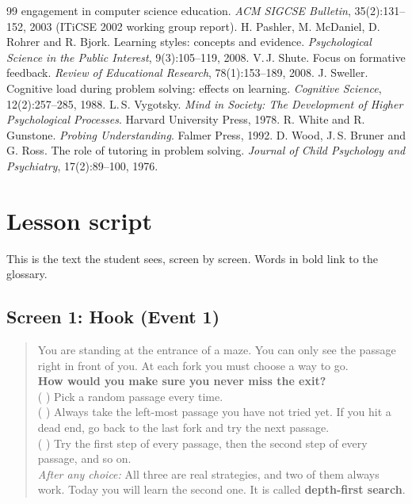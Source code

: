 \documentclass[11pt,a4paper]{article}
\begin{document}
\begin{thebibliography}{99}
  engagement in computer science education. \emph{ACM SIGCSE Bulletin}, 35(2):131--152, 2003
  (ITiCSE 2002 working group report).
 H. Pashler, M. McDaniel, D. Rohrer and R. Bjork. Learning styles: concepts
  and evidence. \emph{Psychological Science in the Public Interest}, 9(3):105--119, 2008.
 V.\,J. Shute. Focus on formative feedback. \emph{Review of Educational Research},
  78(1):153--189, 2008.
 J. Sweller. Cognitive load during problem solving: effects on learning.
  \emph{Cognitive Science}, 12(2):257--285, 1988.
 L.\,S. Vygotsky. \emph{Mind in Society: The Development of Higher
  Psychological Processes}. Harvard University Press, 1978.
 R. White and R. Gunstone. \emph{Probing Understanding}. Falmer Press, 1992.
 D. Wood, J.\,S. Bruner and G. Ross. The role of tutoring in problem solving.
  \emph{Journal of Child Psychology and Psychiatry}, 17(2):89--100, 1976.
\end{thebibliography}

\appendix

\section{Lesson script}
\label{app:script}

This is the text the student sees, screen by screen. Words in bold link to the glossary.

\subsection*{Screen 1: Hook (Event 1)}
\begin{quote}\sffamily\small
You are standing at the entrance of a maze. You can only see the passage right in front of you.
At each fork you must choose a way to go.\\[4pt]
\textbf{How would you make sure you never miss the exit?}\\
( ) Pick a random passage every time.\\
( ) Always take the left-most passage you have not tried yet. If you hit a dead end, go back to
the last fork and try the next passage.\\
( ) Try the first step of every passage, then the second step of every passage, and so on.\\[4pt]
\emph{After any choice:} All three are real strategies, and two of them always work. Today you will
learn the second one. It is called \textbf{depth-first search}.
\end{quote}
\end{document}
